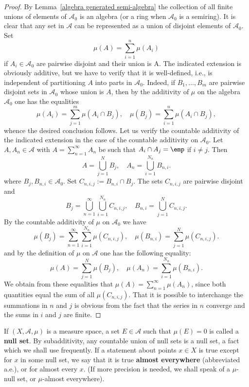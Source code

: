\begin{proof}
By Lemma~\ref{algebra generated semi-algebra} the collection of all finite unions of elements of $\mathcal{A}_0$ is an algebra (or a ring when $\mathcal{A}_0$ is a semiring). It is clear that any set in $\mathcal{A}$ can be represented as a union of disjoint elements of $\mathcal{A}_0$. Set
\[\mu(A)=\sum_{i=1}^{n}\mu(A_i)\]
if $A_i\in\mathcal{A}_0$ are pairwise disjoint and their union is A. The indicated extension is obviously additive, but we have to verify that it is well-defined, i.e., is independent of partitioning $A$ into parts in $\mathcal{A}_0$. Indeed, if $B_1,\dots,B_m$ are pairwise disjoint sets in $\mathcal{A}_0$ whose union is $A$, then by 
the additivity of $\mu$ on the algebra $\mathcal{A}_0$ one has the equalities
\[\mu(A_i)=\sum_{j=1}^{m}\mu(A_i\cap B_j),\quad\mu(B_j)=\sum_{i=1}^{n}\mu(A_i\cap B_j),\]
whence the desired conclusion follows. Let us verify the countable additivity of the indicated extension in the case of the countable additivity on $\mathcal{A}_0$. Let $A,A_n\in\mathcal{A}$ with $A=\sum_{n=1}^{\infty}A_n$ be such that $A_i\cap A_j=\emp$ if $i\neq j$. Then
\[A=\bigcup_{j=1}^{N}B_j,\quad A_n=\bigcup_{i=1}^{N_n}B_{n,i}.\]
where $B_j,B_{n,i}\in\mathcal{A}_0$. Set $C_{n,i,j}:=B_{n,i}\cap B_j$. The sets $C_{n,i,j}$ are pairwise disjoint and
\[B_j=\bigcup_{n=1}^{\infty}\bigcup_{i=1}^{N_n}C_{n,i,j},\quad B_{n,i}=\bigcup_{j=1}^{N}C_{n,i,j}.\]
By the countable additivity of $\mu$ on $\mathcal{A}_0$ we have
\[\mu(B_j)=\sum_{n=1}^{\infty}\sum_{i=1}^{N_n}\mu(C_{n,i,j}),\quad \mu(B_{n,i})=\sum_{j=1}^{N}\mu(C_{n,i,j}).\]
and by the definition of $\mu$ on $\mathcal{A}$ one has the following equality:
\[\mu(A)=\sum_{j=1}^{N}\mu(B_j),\quad \mu(A_n)=\sum_{i=1}^{N_n}\mu(B_{n,i}).\]
We obtain from these equalities that $\mu(A)=\sum_{n=1}^{\infty}\mu(A_n)$, since both quantities equal the sum of all $\mu(C_{n,i,j})$. That it is possible to interchange the summations in $n$ and $j$ is obvious from the fact that the series in $n$ converge and the sums in $i$ and $j$ are finite.
\end{proof}
If $(X,\mathcal{A},\mu)$ is a measure space, a set $E\in\mathcal{A}$ such that $\mu(E)=0$ is called a \textbf{null set}. By subadditivity, any countable union of null sets is a null set, a fact which we shall use frequently. If a statement about points $x\in X$ is true except for $x$ in some null set, we say that it is true \textbf{almost everywhere} (abbreviated a.e.), or for almost every $x$. (If more precision is needed, we shall speak of a $\mu$-null set, or $\mu$-almost everywhere).\par
